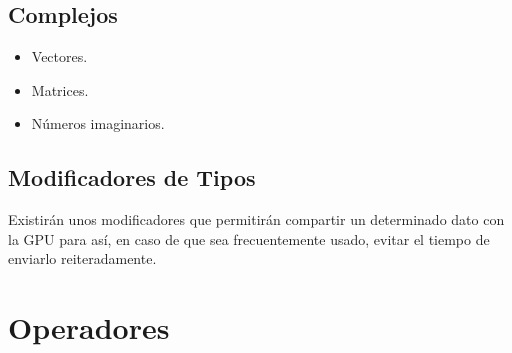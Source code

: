 \documentclass[12pt,a4paper]{article}
\begin{document}
\subsection{Complejos}
\begin{itemize}
\item Vectores.
\item Matrices.
\item Números imaginarios.
\end{itemize}
\subsection{Modificadores de Tipos}
Existirán unos modificadores que permitirán compartir un determinado dato con la GPU para así, en caso de que sea frecuentemente usado, evitar el tiempo de enviarlo reiteradamente.
\section{Operadores}
\end{document}
